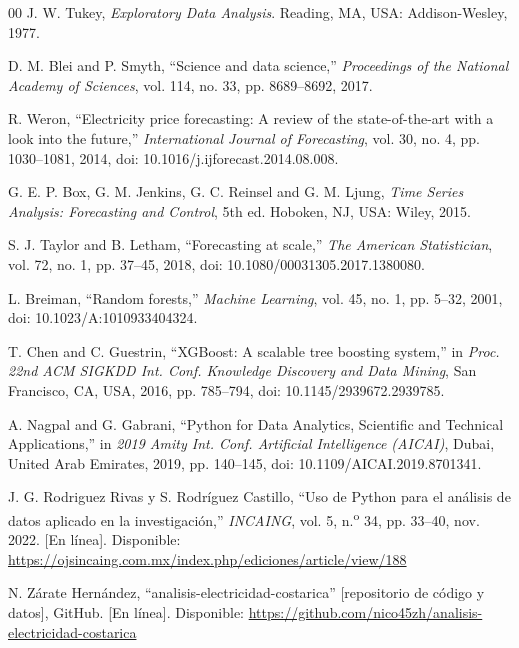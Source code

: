 \documentclass[conference]{IEEEtran}
\begin{document}
\begin{thebibliography}{00}
 J. W. Tukey, \emph{Exploratory Data Analysis}. Reading, MA, USA: Addison-Wesley, 1977.

 D. M. Blei and P. Smyth, ``Science and data science,'' \emph{Proceedings of the National Academy of Sciences}, vol. 114, no. 33, pp. 8689--8692, 2017.

 R. Weron, ``Electricity price forecasting: A review of the state-of-the-art with a look into the future,'' \emph{International Journal of Forecasting}, vol. 30, no. 4, pp. 1030--1081, 2014, doi: 10.1016/j.ijforecast.2014.08.008.

 G. E. P. Box, G. M. Jenkins, G. C. Reinsel and G. M. Ljung, \emph{Time Series Analysis: Forecasting and Control}, 5th ed. Hoboken, NJ, USA: Wiley, 2015.

 S. J. Taylor and B. Letham, ``Forecasting at scale,'' \emph{The American Statistician}, vol. 72, no. 1, pp. 37--45, 2018, doi: 10.1080/00031305.2017.1380080.

 L. Breiman, ``Random forests,'' \emph{Machine Learning}, vol. 45, no. 1, pp. 5--32, 2001, doi: 10.1023/A:1010933404324.

 T. Chen and C. Guestrin, ``XGBoost: A scalable tree boosting system,'' in \emph{Proc. 22nd ACM SIGKDD Int. Conf. Knowledge Discovery and Data Mining}, San Francisco, CA, USA, 2016, pp. 785--794, doi: 10.1145/2939672.2939785.

 A. Nagpal and G. Gabrani, ``Python for Data Analytics, Scientific and Technical Applications,'' in \emph{2019 Amity Int. Conf. Artificial Intelligence (AICAI)}, Dubai, United Arab Emirates, 2019, pp. 140--145, doi: 10.1109/AICAI.2019.8701341.

 J. G. Rodriguez Rivas y S. Rodr\'iguez Castillo, ``Uso de Python para el an\'alisis de datos aplicado en la investigaci\'on,'' \emph{INCAING}, vol. 5, n.\textsuperscript{o} 34, pp. 33--40, nov. 2022. [En l\'inea]. Disponible: \url{https://ojsincaing.com.mx/index.php/ediciones/article/view/188}

 N. Z\'arate Hern\'andez, ``analisis-electricidad-costarica'' [repositorio de c\'odigo y datos], GitHub. [En l\'inea]. Disponible: \url{https://github.com/nico45zh/analisis-electricidad-costarica}

\end{thebibliography}
\end{document}
